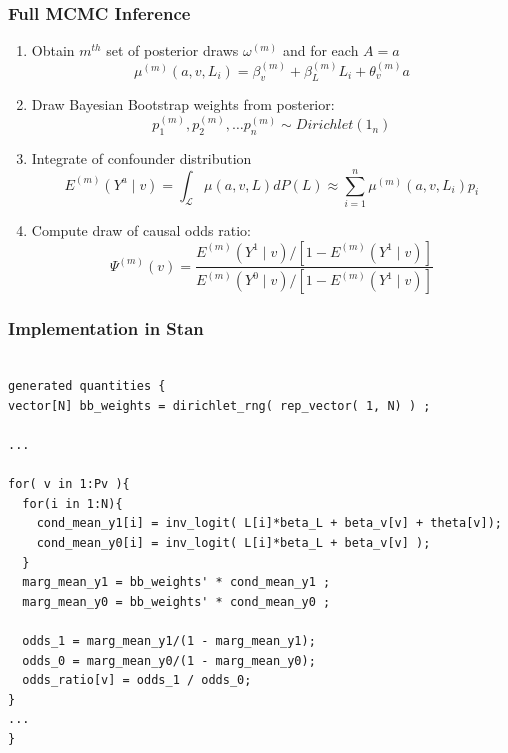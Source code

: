 \documentclass[xcolor=x11names,compress]{beamer}
\renewcommand{\(}{\begin{columns}}
\renewcommand{\)}{\end{columns}}
\newcommand{\<}[1]{\begin{column}{#1}}
\renewcommand{\>}{\end{column}}
\begin{document}
\begin{frame}
	\frametitle{Full MCMC Inference}

	\begin{enumerate}
	\scriptsize
		\item Obtain $m^{th}$ set of posterior draws $\omega^{(m)}$ and for each $A=a$
		$$  \mu^{(m)}( a, v, L_i ) = \beta_v^{(m)} + \beta_L^{(m)}L_i + \theta_v^{(m)} a $$
		
		 
		\item Draw Bayesian Bootstrap weights from posterior:
		$$ p_1^{(m)}, p_2^{(m)}, \dots p_n^{(m)} \sim Dirichlet(1_n) $$
		
		 
		\item Integrate of confounder distribution
		$$ E^{(m)}(Y^a \mid v ) = \int_{\mathcal{L}} \mu(a, v, L) dP(L) \approx \sum_{i=1}^n \mu^{(m)}( a, v, L_i ) p_i $$
		
		 
		\item Compute draw of causal odds ratio:
		$$ \Psi^{(m)} (v) = \frac{ E^{(m)}(Y^1 \mid v)/[1-E^{(m)}(Y^1 \mid v)] }{E^{(m)}(Y^0 \mid v)/[1-E^{(m)}(Y^1 \mid v)] } $$
	\end{enumerate}
\end{frame}

\begin{frame}[fragile]
	\frametitle{Implementation in Stan}
	\scriptsize
	\begin{verbatim}
	
generated quantities {
vector[N] bb_weights = dirichlet_rng( rep_vector( 1, N) ) ;

...

for( v in 1:Pv ){
  for(i in 1:N){
    cond_mean_y1[i] = inv_logit( L[i]*beta_L + beta_v[v] + theta[v]);
    cond_mean_y0[i] = inv_logit( L[i]*beta_L + beta_v[v] );
  }
  marg_mean_y1 = bb_weights' * cond_mean_y1 ;
  marg_mean_y0 = bb_weights' * cond_mean_y0 ;
	
  odds_1 = marg_mean_y1/(1 - marg_mean_y1);
  odds_0 = marg_mean_y0/(1 - marg_mean_y0);
  odds_ratio[v] = odds_1 / odds_0;
}
...
}

	\end{verbatim}
\end{frame}
\end{document}
